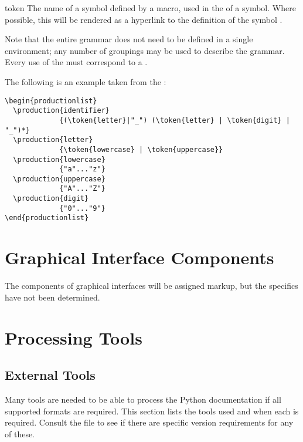 \documentclass{howto}
\begin{document}
    \begin{macrodesc}{token}{}
      The name of a symbol defined by a  macro, used
      in the  of a symbol.  Where possible, this will
      be rendered as a hyperlink to the definition of the symbol
      .
    \end{macrodesc}

    Note that the entire grammar does not need to be defined in a
    single  environment; any number of
    groupings may be used to describe the grammar.  Every use of the
     must correspond to a .

    The following is an example taken from the
    :

\begin{verbatim}
\begin{productionlist}
  \production{identifier}
             {(\token{letter}|"_") (\token{letter} | \token{digit} | "_")*}
  \production{letter}
             {\token{lowercase} | \token{uppercase}}
  \production{lowercase}
             {"a"..."z"}
  \production{uppercase}
             {"A"..."Z"}
  \production{digit}
             {"0"..."9"}
\end{productionlist}
\end{verbatim}


\section{Graphical Interface Components}

  The components of graphical interfaces will be assigned markup, but
  the specifics have not been determined.


\section{Processing Tools}

  \subsection{External Tools}

    Many tools are needed to be able to process the Python
    documentation if all supported formats are required.  This
    section lists the tools used and when each is required.  Consult
    the  file to see if there are specific version
    requirements for any of these.
\end{document}
